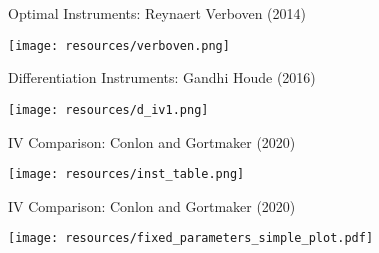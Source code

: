 \documentclass[xcolor=pdftex,dvipsnames,table,mathserif,aspectratio=169]{beamer}
\begin{document}
\begin{frame}{Optimal Instruments: Reynaert Verboven (2014)}
\begin{center}
\texttt{[image: resources/verboven.png]}
\end{center}
\end{frame}


\begin{frame}{Differentiation Instruments: Gandhi Houde (2016)}
\begin{center}
\texttt{[image: resources/d\_iv1.png]}
\end{center}
\end{frame}

\begin{frame}{IV Comparison: Conlon and Gortmaker (2020)}
\begin{center}
\texttt{[image: resources/inst\_table.png]}
\end{center}
\end{frame}

\begin{frame}{IV Comparison: Conlon and Gortmaker (2020)}
\begin{center}
\texttt{[image: resources/fixed\_parameters\_simple\_plot.pdf]}
\end{center}
\end{frame}
\end{document}
